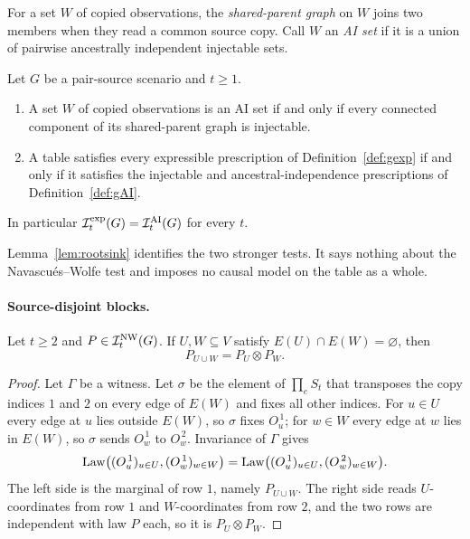 \begin{definition}\label{def:sharedparent}
For a set $W$ of copied observations, the \emph{shared-parent graph} on $W$ joins two members when they read a common source copy. Call $W$ an \emph{AI set} if it is a union of pairwise ancestrally independent injectable sets.
\end{definition}

\begin{lemma}\label{lem:rootsink}
Let $G$ be a pair-source scenario and $t\ge1$.
\begin{enumerate}[label=(\roman*),nosep]
\item A set $W$ of copied observations is an AI set if and only if every connected component of its shared-parent graph is injectable.
\item A table satisfies every expressible prescription of Definition~\ref{def:gexp} if and only if it satisfies the injectable and ancestral-independence prescriptions of Definition~\ref{def:gAI}.
\end{enumerate}
In particular $\mathcal I^{\mathrm{exp}}_t(G)=\mathcal I^{\mathrm{AI}}_t(G)$ for every $t$.
\end{lemma}


Lemma~\ref{lem:rootsink} identifies the two stronger tests. It says nothing about the Navascués--Wolfe test and imposes no causal model on the table as a whole.

\paragraph{Source-disjoint blocks.}

\begin{lemma}\label{lem:sourcedisjoint}
Let $t\ge2$ and $P\in\mathcal I^{\mathrm{NW}}_t(G)$. If $U,W\subseteq V$ satisfy $E(U)\cap E(W)=\varnothing$, then
\[
P_{U\cup W}=P_U\otimes P_W.
\]
\end{lemma}

\begin{proof}
Let $\Gamma$ be a witness. Let $\sigma$ be the element of $\prod_eS_t$ that transposes the copy indices $1$ and $2$ on every edge of $E(W)$ and fixes all other indices. For $u\in U$ every edge at $u$ lies outside $E(W)$, so $\sigma$ fixes $O_u^{\,1}$; for $w\in W$ every edge at $w$ lies in $E(W)$, so $\sigma$ sends $O_w^{\,1}$ to $O_w^{\,2}$. Invariance of $\Gamma$ gives
\[
\operatorname{Law}\bigl((O_u^{\,1})_{u\in U},(O_w^{\,1})_{w\in W}\bigr)=\operatorname{Law}\bigl((O_u^{\,1})_{u\in U},(O_w^{\,2})_{w\in W}\bigr).
\]
The left side is the marginal of row $1$, namely $P_{U\cup W}$. The right side reads $U$-coordinates from row $1$ and $W$-coordinates from row $2$, and the two rows are independent with law $P$ each, so it is $P_U\otimes P_W$.
\end{proof}


